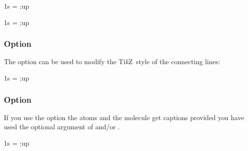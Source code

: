\documentclass[load-preamble+]{cnltx-doc}
\newcommand*\TikZ{Ti\textit{k}Z}
\begin{document}
\begin{example}
  \begin{modiagram}[up-el-pos=.333,down-el-pos=.667]
     { 1s = {;up} }
  \end{modiagram}
\end{example}

\begin{example}
  \begin{modiagram}[up-el-pos=.7,down-el-pos=.3]
     { 1s = {;up} }
  \end{modiagram}
\end{example}

\subsubsection{Option }\label{option:lines}
The option  can be used to modify the \TikZ\ style of the
connecting lines:
\begin{example}
  \begin{modiagram}[lines={gray,thin}]
     { 1s = {;up} }
  \end{modiagram}
\end{example}

\subsubsection{Option }\label{option:names}
If you use the option  the atoms and the molecule get captions
provided you have used the optional  argument of  and/or
.
\begin{example}
  \begin{modiagram}[names]
     { 1s = {;up} }
  \end{modiagram}
\end{example}
\end{document}
